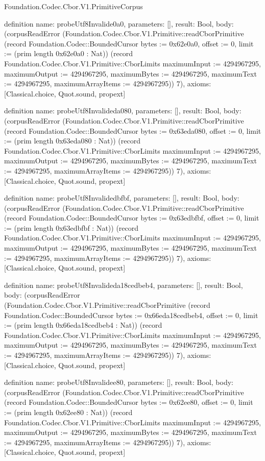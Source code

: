 \begin{lexlean}{Foundation.Codec.Cbor.V1.PrimitiveCorpus}
\begin{semanticmodule}
definition{
  name: probeUtf8Invalide0a0,
  parameters: [],
  result: Bool,
  body: (corpusReadError (Foundation.Codec.Cbor.V1.Primitive::readCborPrimitive (record Foundation.Codec::BoundedCursor {bytes := 0x62e0a0, offset := 0, limit := (prim length 0x62e0a0 : Nat)}) (record Foundation.Codec.Cbor.V1.Primitive::CborLimits {maximumInput := 4294967295, maximumOutput := 4294967295, maximumBytes := 4294967295, maximumText := 4294967295, maximumArrayItems := 4294967295})) 7),
  axioms: [Classical.choice, Quot.sound, propext]
}

definition{
  name: probeUtf8Invalideda080,
  parameters: [],
  result: Bool,
  body: (corpusReadError (Foundation.Codec.Cbor.V1.Primitive::readCborPrimitive (record Foundation.Codec::BoundedCursor {bytes := 0x63eda080, offset := 0, limit := (prim length 0x63eda080 : Nat)}) (record Foundation.Codec.Cbor.V1.Primitive::CborLimits {maximumInput := 4294967295, maximumOutput := 4294967295, maximumBytes := 4294967295, maximumText := 4294967295, maximumArrayItems := 4294967295})) 7),
  axioms: [Classical.choice, Quot.sound, propext]
}

definition{
  name: probeUtf8Invalidedbfbf,
  parameters: [],
  result: Bool,
  body: (corpusReadError (Foundation.Codec.Cbor.V1.Primitive::readCborPrimitive (record Foundation.Codec::BoundedCursor {bytes := 0x63edbfbf, offset := 0, limit := (prim length 0x63edbfbf : Nat)}) (record Foundation.Codec.Cbor.V1.Primitive::CborLimits {maximumInput := 4294967295, maximumOutput := 4294967295, maximumBytes := 4294967295, maximumText := 4294967295, maximumArrayItems := 4294967295})) 7),
  axioms: [Classical.choice, Quot.sound, propext]
}

definition{
  name: probeUtf8Invalideda18cedbeb4,
  parameters: [],
  result: Bool,
  body: (corpusReadError (Foundation.Codec.Cbor.V1.Primitive::readCborPrimitive (record Foundation.Codec::BoundedCursor {bytes := 0x66eda18cedbeb4, offset := 0, limit := (prim length 0x66eda18cedbeb4 : Nat)}) (record Foundation.Codec.Cbor.V1.Primitive::CborLimits {maximumInput := 4294967295, maximumOutput := 4294967295, maximumBytes := 4294967295, maximumText := 4294967295, maximumArrayItems := 4294967295})) 7),
  axioms: [Classical.choice, Quot.sound, propext]
}

definition{
  name: probeUtf8Invalidee80,
  parameters: [],
  result: Bool,
  body: (corpusReadError (Foundation.Codec.Cbor.V1.Primitive::readCborPrimitive (record Foundation.Codec::BoundedCursor {bytes := 0x62ee80, offset := 0, limit := (prim length 0x62ee80 : Nat)}) (record Foundation.Codec.Cbor.V1.Primitive::CborLimits {maximumInput := 4294967295, maximumOutput := 4294967295, maximumBytes := 4294967295, maximumText := 4294967295, maximumArrayItems := 4294967295})) 7),
  axioms: [Classical.choice, Quot.sound, propext]
}


\end{semanticmodule}
\end{lexlean}
